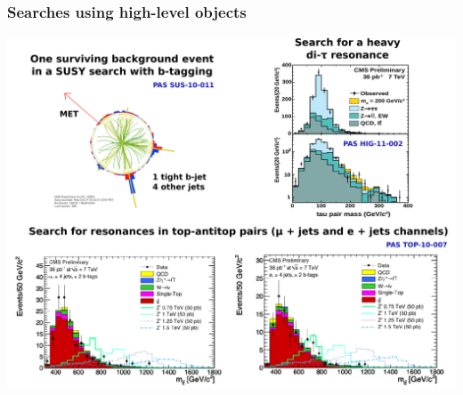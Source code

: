 \documentclass[compress]{beamer}
\begin{document}
\begin{frame}
\frametitle{Searches using high-level objects}

\includegraphics[width=\linewidth]{high-level.pdf}
\end{frame}
\end{document}
